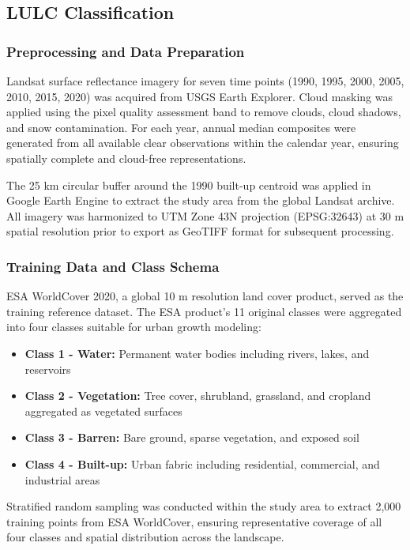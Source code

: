 \documentclass[12pt,a4paper]{article}
\begin{document}
\subsection{LULC Classification}

\subsubsection{Preprocessing and Data Preparation}
Landsat surface reflectance imagery for seven time points (1990, 1995, 2000, 2005, 2010, 2015, 2020) was acquired from USGS Earth Explorer. Cloud masking was applied using the pixel quality assessment band to remove clouds, cloud shadows, and snow contamination. For each year, annual median composites were generated from all available clear observations within the calendar year, ensuring spatially complete and cloud-free representations.

The 25 km circular buffer around the 1990 built-up centroid was applied in Google Earth Engine to extract the study area from the global Landsat archive. All imagery was harmonized to UTM Zone 43N projection (EPSG:32643) at 30 m spatial resolution prior to export as GeoTIFF format for subsequent processing.

\subsubsection{Training Data and Class Schema}
ESA WorldCover 2020, a global 10 m resolution land cover product, served as the training reference dataset. The ESA product's 11 original classes were aggregated into four classes suitable for urban growth modeling:

\begin{itemize}
\item \textbf{Class 1 - Water:} Permanent water bodies including rivers, lakes, and reservoirs
\item \textbf{Class 2 - Vegetation:} Tree cover, shrubland, grassland, and cropland aggregated as vegetated surfaces
\item \textbf{Class 3 - Barren:} Bare ground, sparse vegetation, and exposed soil
\item \textbf{Class 4 - Built-up:} Urban fabric including residential, commercial, and industrial areas
\end{itemize}

Stratified random sampling was conducted within the study area to extract 2,000 training points from ESA WorldCover, ensuring representative coverage of all four classes and spatial distribution across the landscape.
\end{document}
